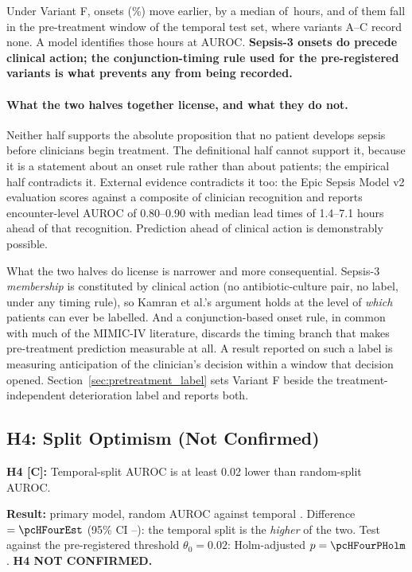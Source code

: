 Under Variant F, \pcFNMovedEarlier{} onsets (\pcFPctMovedEarlier\%) move
earlier, by a median of \pcFMedianShiftH\,hours, and
\pcPreTreatOnsetsVarF{} of them fall in the pre-treatment window of the temporal
test set, where variants A--C record none. A model identifies those hours at
\pcPreTreatAurocPrimaryF{} AUROC. \textbf{Sepsis-3 onsets do precede clinical
action; the conjunction-timing rule used for the pre-registered variants is what
prevents any from being recorded.}

\paragraph{What the two halves together license, and what they do not.}
Neither half supports the absolute proposition that no patient develops sepsis
before clinicians begin treatment. The definitional half cannot support it,
because it is a statement about an onset rule rather than about patients; the
empirical half contradicts it. External evidence contradicts it too: the Epic
Sepsis Model v2 evaluation \cite{wong2026epic} scores against a composite of
clinician recognition and reports encounter-level AUROC of 0.80--0.90 with
median lead times of 1.4--7.1 hours ahead of that recognition. Prediction ahead
of clinical action is demonstrably possible.

What the two halves do license is narrower and more consequential. Sepsis-3
\emph{membership} is constituted by clinical action (no antibiotic-culture
pair, no label, under any timing rule), so Kamran et al.'s
\cite{kamran2024evaluation} argument holds at the level of \emph{which} patients
can ever be labelled. And a conjunction-based onset rule, in common with much of
the MIMIC-IV literature, discards the timing branch that makes pre-treatment
prediction measurable at all. A result reported on such a label is measuring
anticipation of the clinician's decision within a window that decision opened.
Section~\ref{sec:pretreatment_label} sets Variant F beside the
treatment-independent deterioration label and reports both.

\subsection{H4: Split Optimism (Not Confirmed)}
\label{sec:h4_discussion}

\begin{mdframed}[backgroundcolor=ATUOrange!20, linecolor=ATUOrange]
    \textbf{H4 [C]:} Temporal-split AUROC is at least 0.02 lower than
    random-split AUROC.

    \textbf{Result:} primary model, random AUROC \pcAurocRandomPrimaryB{}
    against temporal \pcAurocPrimaryB. Difference $= \pcHFourEst$ (95\% CI
    \pcHFourCiLo--\pcHFourCiHi): the temporal split is the \emph{higher} of
    the two. Test against the pre-registered threshold $\theta_0 = 0.02$:
    Holm-adjusted $p = \pcHFourPHolm$. \textbf{H4 NOT CONFIRMED.}
\end{mdframed}

